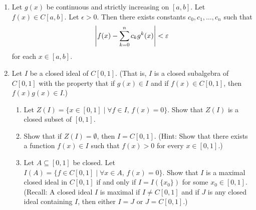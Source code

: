 \documentclass[notoc,notitlepage]{tufte-book}
\begin{document}
\begin{enumerate}
  \item Let $g(x)$ be continuous and strictly increasing on $[a, b]$. Let $f(x) \in C[a, b]$. Let $\epsilon > 0$. Then there exists constants $c_0, c_1, \ldots, c_n$ such that
    \begin{equation*}
      \left| f(x) - \sum_{k=0}^{n} c_k g^k(x) \right| < \varepsilon
    \end{equation*}
    for each $x \in [a, b]$.

  \item Let $I$ be a closed ideal of $C[0, 1]$. (That is, $I$ is a closed subalgebra of $C[0, 1]$ with the property that if $g(x) \in I$ and if $f(x) \in C[0, 1]$, then $f(x) g(x) \in I$.)
    \begin{enumerate}
      \item Let $Z(I) = \{ x \in [0, 1] \mid \forall f \in I, \, f(x) = 0 \}$. Show that $Z(I)$ is a closed subset of $[0, 1]$.
      \item Show that if $Z(I) = \emptyset$, then $I = C[0, 1]$. (Hint: Show that there exists a function $f(x) \in I$ such that $f(x) > 0$ for every $x \in [0, 1]$.)
      \item Let $A \subseteq [0, 1]$ be closed. Let $I(A) = \{ f \in C[0, 1] \mid \forall x \in A, \, f(x) = 0 \}$. Show that $I$ is a maximal closed ideal in $C[0, 1]$ if and only if $I = I( \{ x_0 \} )$ for some $x_0 \in [0, 1]$. \\
        (Recall: A closed ideal $I$ is maximal if $I \neq C[0, 1]$ and if $J$ is any closed ideal containing $I$, then either $I = J$ or $J = C[0, 1]$.)
    \end{enumerate}
\end{enumerate}




\backmatter\

\pagestyle{plain}



\printindex

\listoftodos
\end{document}
